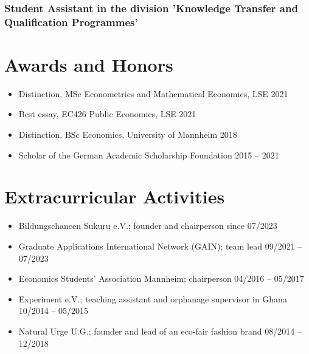 \documentclass[a4paper, english, 10pt]{cv_class}
\begin{document}
\subsubsection{Student Assistant in the division 'Knowledge Transfer and Qualification Programmes'}

\section{Awards and Honors}

\begin{itemize}[noitemsep]
	\item Distinction, MSc Econometrics and Mathematical Economics, LSE \hfill 2021
	\item Best essay, EC426 Public Economics, LSE \hfill 2021
	\item Distinction, BSc Economics, University of Mannheim \hfill 2018
	\item Scholar of the German Academic Scholarship Foundation \hfill 2015 -- 2021
\end{itemize}

\section{Extracurricular Activities}

\begin{itemize}[noitemsep]
	\item Bildungschancen Sukuru e.V.; founder and chairperson \hfill since 07/2023
	\item Graduate Applications International Network (GAIN); team lead \hfill 09/2021 -- 07/2023
	\item Economics Students' Association Mannheim; chairperson \hfill 04/2016 -- 05/2017
	\item Experiment e.V.; teaching assistant and orphanage supervisor in Ghana \hfill 10/2014 -- 05/2015
	\item Natural Urge U.G.; founder and lead of an eco-fair fashion brand \hfill 08/2014 -- 12/2018
\end{itemize}
\end{document}
